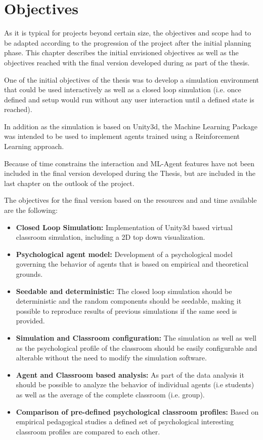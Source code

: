 \chapter{Objectives}
As it is typical for projects beyond certain size, the objectives and scope had to
be adapted according to the progression of the project after the initial planning phase.
This chapter describes the initial envisioned objectives as well as the objectives
reached with the final version developed during as part of the thesis.

One of the initial objectives of the thesis was to develop a simulation environment that
could be used interactively as well as a closed loop simulation (i.e. once defined
and setup would run without any user interaction until a defined state is reached).

In addition as the simulation is based on Unity3d, the Machine Learning Package
was intended to be used to implement agents trained using a Reinforcement Learning approach.

Because of time constrains the interaction and ML-Agent features have not been included
in the final version developed during the Thesis, but are included in the last chapter
on the outlook of the project.

\bb

The objectives for the final version based on the resources and and time available
are the following:

\begin{itemize}
    \item \textbf{Closed Loop Simulation:} Implementation of Unity3d based virtual
    classroom simulation, including a 2D top down visualization.
    \item \textbf{Psychological agent model:} Development of a psychological model
    governing the behavior of agents that is based on empirical and theoretical grounds.
    \item \textbf{Seedable and deterministic:} The closed loop simulation should be
    deterministic and the random components should be seedable, making it possible
    to reproduce results of previous simulations if the same seed is provided.
    \item \textbf{Simulation and Classroom configuration:} The simulation as well
    as well as the psychological profile of the classroom should be easily configurable
    and alterable without the need to modify the simulation software.
    \item \textbf{Agent and Classroom based analysis:} As part of the data analysis
    it should be possible to analyze the behavior of individual agents (i.e students)
    as well as the average of the complete classroom (i.e. group).
    \item \textbf{Comparison of pre-defined psychological classroom profiles:} Based
    on empirical pedagogical studies a defined set of psychological interesting classroom
    profiles are compared to each other.
\end{itemize}

